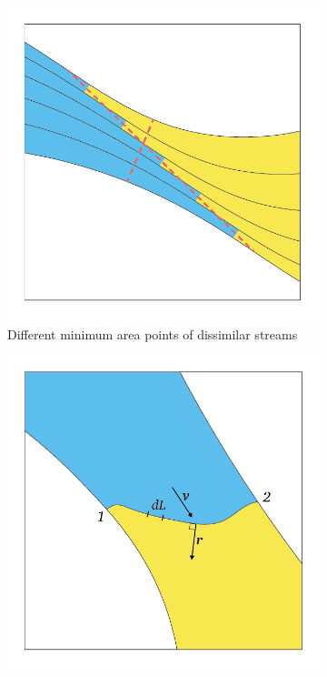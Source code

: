 \documentclass[a4paper, 11pt, twoside]{report}
\begin{document}
\begin{figure}[H]
	\centering
	\begin{subfigure}{.45\textwidth}
		\centering
		\includegraphics[width=\linewidth]{figs/illustration_of_minimum_area_ver04.png}
		\caption{Different minimum area points of dissimilar streams}
		\label{fig:illustration_of_minimum_area}
	\end{subfigure}
	\hspace{0.05\textwidth}
	\begin{subfigure}{.45\textwidth}
		\centering
		\includegraphics[width=\linewidth]{figs/illustration_of_equivalent_throat_area_integral_ver03.png}

\end{subfigure}
\end{figure}
\end{document}

